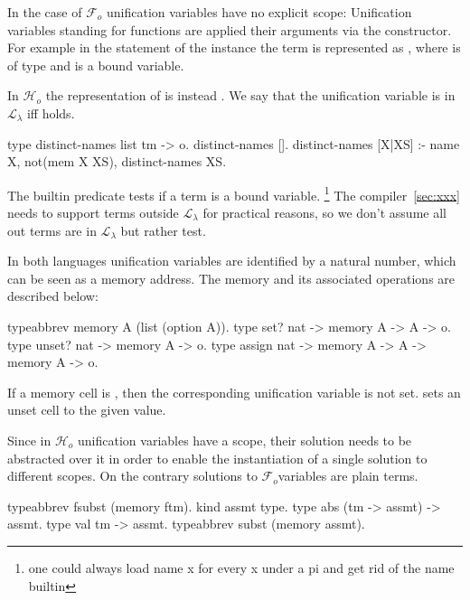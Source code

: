 \documentclass[sigconf,natbib=false]{acmart}
\newcommand{\llambda}{\ensuremath{\mathcal{L}_\lambda}\xspace}
\newcommand{\Fo}{\ensuremath{\mathcal{F}_{\!o}\xspace}} %
\newcommand{\Ho}{\ensuremath{\mathcal{H}_o}\xspace}
\begin{document}
\noindent
In the case of \Fo{} unification variables  have no explicit scope:
Unification variables standing for functions are applied their arguments
via the  constructor.
For example in the statement of the instance  the
term  is represented as , where 
is of type  and  is a bound variable.

In \Ho the representation of  is instead .
We say that the unification variable  is in \llambda iff
 holds.

\begin{elpicode}
type distinct-names list tm -> o.
distinct-names [].
distinct-names [X|XS] :- name X, not(mem X XS),
  distinct-names XS.
\end{elpicode}

\noindent
The  builtin predicate tests if a term is a bound variable.
\footnote{one could always load name x for every x under a pi and get rid of the name builtin}
The
compiler~\ref{sec:xxx} needs to support terms outside \llambda for practical
reasons, so we don't assume all out terms are in \llambda but rather test.

In both languages unification variables are identified by a natural number,
which can be seen as a memory address. The memory and its associated
operations are described below:

\begin{elpicode}
typeabbrev memory A (list (option A)).
type set?   nat -> memory A -> A -> o.
type unset? nat -> memory A -> o.
type assign nat -> memory A -> A -> memory A -> o.
\end{elpicode}

\noindent 
If a memory cell is , then the corresponding unification variable
is not set.  sets an unset cell to the given value.

Since in \Ho unification variables have a scope, their solution needs to be
abstracted over it in order to enable the instantiation of a single
solution to different scopes. On the contrary solutions to \Fo variables
are plain terms.

\begin{elpicode}
  typeabbrev fsubst (memory ftm).
  kind assmt type.
  type abs (tm -> assmt) -> assmt.
  type val tm -> assmt.
  typeabbrev subst (memory assmt).
\end{elpicode}
\end{document}
